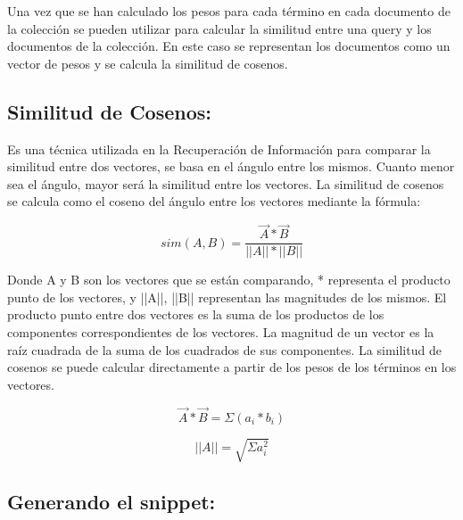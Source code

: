 \documentclass[a4paper,12pt,twocolumn]{article}
\begin{document}
Una vez que se han calculado los pesos para cada término en cada documento de la colección
se pueden utilizar para calcular la similitud entre una query y los documentos de la colección.
En este caso se representan los documentos como un vector de pesos y se calcula la similitud
de cosenos.

\subsection{Similitud de Cosenos:}
Es una técnica utilizada en la Recuperación de Información para comparar la similitud entre dos
vectores, se basa en el ángulo entre los mismos. Cuanto menor sea el ángulo, mayor será la
similitud entre los vectores. La similitud de cosenos se calcula como el coseno del ángulo entre
los vectores mediante la fórmula:
    \begin{center}
    \begin{equation}
        sim(A, B) = \frac{\overrightarrow{A} * \overrightarrow{B}}{||A|| * ||B||} 
    \end{equation}
    \end{center}

Donde A y B son los vectores que se están comparando, * representa el producto punto de los
vectores, y ||A||, ||B|| representan las magnitudes de los mismos.
El producto punto entre dos vectores es la suma de los productos de los componentes
correspondientes de los vectores. La magnitud de un vector es la raíz cuadrada de la suma de
los cuadrados de sus componentes. La similitud de cosenos se puede calcular directamente a
partir de los pesos de los términos en los vectores.
    
    \begin{center}
    \begin{equation}
        \overrightarrow{A} * \overrightarrow{B} = \Sigma(a_i * b_i)
    \tag*{Producto Vectorial}
    \end{equation}
    \end{center}
    
    \begin{center}
    \begin{equation}
    \tag{Norma de un vector}
        ||A|| = \sqrt{\Sigma a_i^2}
    \end{equation}
    \end{center}

\subsection{Generando el snippet:}
\end{document}
